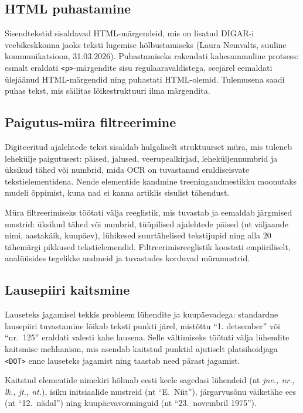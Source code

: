\subsection{HTML puhastamine}\label{subsec:html-puhastamine}
Sisendtekstid sisaldavad HTML-märgendeid, mis on lisatud DIGAR-i veebikeskkonna jaoks teksti lugemise hõlbustamiseks (Laura Nemvalts, suuline kommunikatsioon, 31.03.2026). Puhastamiseks rakendati kahesammuline protsess: esmalt eraldati \texttt{<p>}-märgendite sisu regulaaravaldistega, seejärel eemaldati ülejäänud HTML-märgendid ning puhastati HTML-olemid. Tulemusena saadi puhas tekst, mis säilitas lõikestruktuuri ilma märgendita.


\subsection{Paigutus-müra filtreerimine}\label{subsec:layout-mura}
Digiteeritud ajalehtede tekst sisaldab hulgaliselt struktuurset müra, mis tuleneb lehekülje paigutusest: päised, jalused, veerupealkirjad, leheküljennumbrid ja üksikud tähed või numbrid, mida OCR on tuvastanud eraldiseisvate tekstielementidena. Nende elementide kandmine treeningandmestikku moonutaks mudeli õppimist, kuna nad ei kanna artiklis sisulist tähendust.

Müra filtreerimiseks töötati välja reeglistik, mis tuvastab ja eemaldab järgmised mustrid: üksikud tähed või numbrid, tüüpilised ajalehtede päised (nt väljaande nimi, aastakäik, kuupäev), lühikesed suurtähelised tekstijupid ning alla 20 tähemärgi pikkused tekstielemendid. Filtreerimisreeglistik koostati empiiriliselt, analüüsides tegelikke andmeid ja tuvastades korduvad müramustrid.


\subsection{Lausepiiri kaitsmine}\label{subsec:lausepiiri-kaitsmine}
Lauseteks jagamisel tekkis probleem lühendite ja kuupäevadega: standardne lausepiiri tuvastamine lõikab teksti punkti järel, mistõttu ``1. detsember'' või ``nr.~125'' eraldati valesti kahe lausena. Selle vältimiseks töötati välja lühendite kaitsmise mehhanism, mis asendab kaitstud punktid ajutiselt platsihoidjaga \texttt{<DOT>} enne lauseteks jagamist ning taastab need pärast jagamist.

Kaitstud elementide nimekiri hõlmab eesti keele sagedasi lühendeid (nt \textit{jne., nr., lk., jt., nt.}), isiku initsiaalide mustreid (nt ``E.~Niit''), järgarvusõnu väiketähe ees (nt ``12.~nädal'') ning kuupäevavorminguid (nt ``23.~novembril 1975'').


